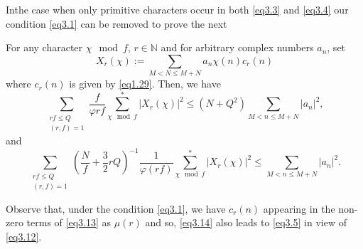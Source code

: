 In\pageoriginale the case when only primitive characters occur in both
\eqref{eq3.3} and \eqref{eq3.4} our condition \eqref{eq3.1} can be
removed to prove the next 

\begin{theorem}\label{chap3-thm3.2}%
For any character $\chi \mod f$, $r \in \mathbb{N}$ and for arbitrary
complex numbers $a_n$, set 
\begin{equation*}
X_r (\chi):=\sum_{M<N \leq M+N} a_n \chi(n) c_r(n)
\tag{3.13}\label{eq3.13} 
\end{equation*} 
 where $c_r(n)$ is given by \eqref{eq1.29}. Then, we have
 \begin{equation*}
\sum_{\substack{rf \leq Q \\ (r,f)=1}} \frac{f}{\varphi{rf}} \sum^*_{\chi
  \mod f}|X_r(\chi)|^2 \leq (N+Q^2) \sum_{M < n \leq M+N}|a_n|^2,
\tag{3.14}\label{eq3.14} 
\end{equation*} 
and
\begin{equation*}
\sum_{\substack {rf \leq Q \\ (r,f) =1}}(\frac{N}{f} +
\frac{3}{2}rQ)^{-1} \frac{1}{\varphi (rf)} \sum^*_{\chi \mod
  f}|X_r(\chi)|^2 \leq \sum_{M < n \leq M+N}|a_n|^2. \tag{3.15}\label{eq3.15} 
 \end{equation*} 
\end{theorem}

\begin{remark*}%
Observe that, under the condition \eqref{eq3.1}, we have $c_r(n)$ appearing
in the non-zero terms of \eqref{eq3.13} as $\mu(r)$ and so,
\eqref{eq3.14} also leads to \eqref{eq3.5} in view of \eqref{eq3.12}. 
\end{remark*} 

